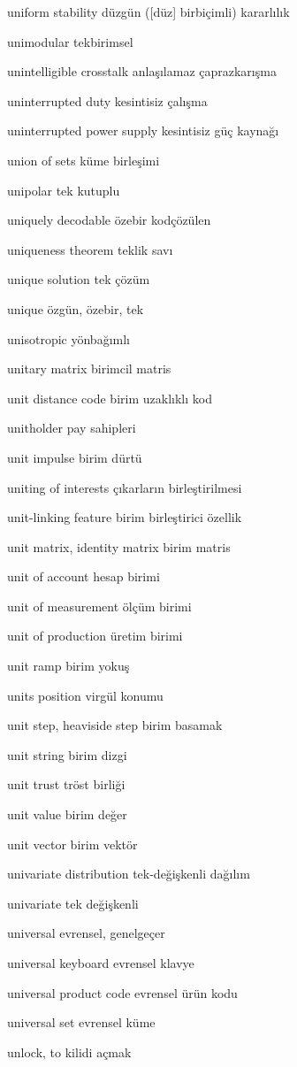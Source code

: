 \documentclass[12pt,fleqn]{article}\usepackage{../../common}
\begin{document}
uniform stability düzgün ([düz] birbiçimli) kararlılık

unimodular tekbirimsel

unintelligible crosstalk anlaşılamaz çaprazkarışma

uninterrupted duty kesintisiz çalışma

uninterrupted power supply kesintisiz güç kaynağı

union of sets küme birleşimi

unipolar tek kutuplu

uniquely decodable özebir kodçözülen

uniqueness theorem teklik savı

unique solution tek çözüm

unique özgün, özebir, tek

unisotropic yönbağımlı

unitary matrix birimcil matris

unit distance code birim uzaklıklı kod

unitholder pay sahipleri

unit impulse birim dürtü

uniting of interests çıkarların birleştirilmesi

unit-linking feature birim birleştirici özellik

unit matrix, identity matrix birim matris

unit of account hesap birimi

unit of measurement ölçüm birimi

unit of production üretim birimi

unit ramp birim yokuş

units position virgül konumu

unit step, heaviside step birim basamak

unit string birim dizgi

unit trust tröst birliği

unit value birim değer

unit vector birim vektör

univariate distribution tek-değişkenli dağılım

univariate tek değişkenli

universal evrensel, genelgeçer

universal keyboard evrensel klavye

universal product code evrensel ürün kodu

universal set evrensel küme

unlock, to kilidi açmak
\end{document}
